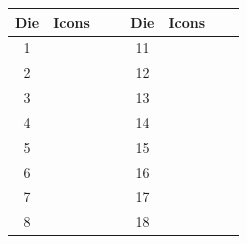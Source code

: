 \documentclass[landscape, a4paper, parskip=half, DIV=13]{scrartcl}
\begin{document}
\begin{center}
{\begin{center}
\raggedright
\begin{tabular}{c@{\hskip 6pt}c@{\hskip 3pt}c@{\hskip 3pt}c@{\hskip 6pt}c@{\hskip 6pt}c@{\hskip 3pt}c@{\hskip 3pt}c}\toprule
Die & \multicolumn{3}{c}{Icons\ \ \ \,} & Die & \multicolumn{3}{c}{Icons\ \ \ \,} \\ \midrule
\phantom{1}1 & \raisebox{-0.25ex}{\drawonestar{}} & \raisebox{-0.25ex}{\drawtwostar{}} & \raisebox{-0.25ex}{\drawthreestar{}} & 11 & \raisebox{-0.25ex}{\drawfourstar{}} & \raisebox{-0.25ex}{\drawfivestar{}} & \raisebox{-0.25ex}{\drawsixstar{}} \\[0.5ex]
\phantom{1}2 & \raisebox{-0.25ex}{\drawonestar{}} & \raisebox{-0.25ex}{\drawtwostar{}} & \raisebox{-0.25ex}{\drawfourstar{}} & 12 & \raisebox{-0.25ex}{\drawthreestar{}} & \raisebox{-0.25ex}{\drawfivestar{}} & \raisebox{-0.25ex}{\drawsixstar{}} \\[0.5ex]
\phantom{1}3 & \raisebox{-0.25ex}{\drawonestar{}} & \raisebox{-0.25ex}{\drawtwostar{}} & \raisebox{-0.25ex}{\drawfivestar{}} & 13 & \raisebox{-0.25ex}{\drawthreestar{}} & \raisebox{-0.25ex}{\drawfourstar{}} & \raisebox{-0.25ex}{\drawsixstar{}} \\[0.5ex]
\phantom{1}4 & \raisebox{-0.25ex}{\drawonestar{}} & \raisebox{-0.25ex}{\drawtwostar{}} & \raisebox{-0.25ex}{\drawsixstar{}} & 14 & \raisebox{-0.25ex}{\drawthreestar{}} & \raisebox{-0.25ex}{\drawfourstar{}} & \raisebox{-0.25ex}{\drawfivestar{}} \\[0.5ex]
\phantom{1}5 & \raisebox{-0.25ex}{\drawonestar{}} & \raisebox{-0.25ex}{\drawthreestar{}} & \raisebox{-0.25ex}{\drawfourstar{}} & 15 & \raisebox{-0.25ex}{\drawtwostar{}} & \raisebox{-0.25ex}{\drawfivestar{}} & \raisebox{-0.25ex}{\drawsixstar{}} \\[0.5ex]
\phantom{1}6 & \raisebox{-0.25ex}{\drawonestar{}} & \raisebox{-0.25ex}{\drawthreestar{}} & \raisebox{-0.25ex}{\drawfivestar{}} & 16 & \raisebox{-0.25ex}{\drawtwostar{}} & \raisebox{-0.25ex}{\drawfourstar{}} & \raisebox{-0.25ex}{\drawsixstar{}} \\[0.5ex]
\phantom{1}7 & \raisebox{-0.25ex}{\drawonestar{}} & \raisebox{-0.25ex}{\drawthreestar{}} & \raisebox{-0.25ex}{\drawsixstar{}} & 17 & \raisebox{-0.25ex}{\drawtwostar{}} & \raisebox{-0.25ex}{\drawfourstar{}} & \raisebox{-0.25ex}{\drawfivestar{}} \\[0.5ex]
\phantom{1}8 & \raisebox{-0.25ex}{\drawonestar{}} & \raisebox{-0.25ex}{\drawfourstar{}} & \raisebox{-0.25ex}{\drawfivestar{}} & 18 & \raisebox{-0.25ex}{\drawtwostar{}} & \raisebox{-0.25ex}{\drawthreestar{}} & \raisebox{-0.25ex}{\drawsixstar{}} \\[0.5ex]

\end{tabular}
\end{center}}
\end{center}
\end{document}
